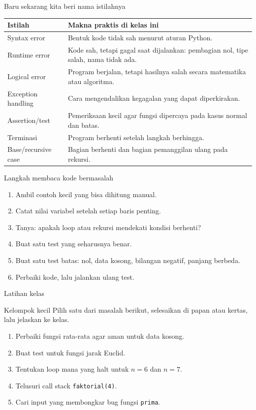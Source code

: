 \documentclass[aspectratio=169,11pt]{beamer}
\begin{document}
\begin{frame}{Baru sekarang kita beri nama istilahnya}
\begin{center}
\begin{tabular}{p{3.1cm}p{8.2cm}}
\toprule
Istilah & Makna praktis di kelas ini\\
\midrule
Syntax error & Bentuk kode tidak sah menurut aturan Python.\\
Runtime error & Kode sah, tetapi gagal saat dijalankan: pembagian nol, tipe salah, nama tidak ada.\\
Logical error & Program berjalan, tetapi hasilnya salah secara matematika atau algoritma.\\
Exception handling & Cara mengendalikan kegagalan yang dapat diperkirakan.\\
Assertion/test & Pemeriksaan kecil agar fungsi dipercaya pada kasus normal dan batas.\\
Terminasi & Program berhenti setelah langkah berhingga.\\
Base/recursive case & Bagian berhenti dan bagian pemanggilan ulang pada rekursi.\\
\bottomrule
\end{tabular}
\end{center}
\end{frame}

\begin{frame}{Langkah membaca kode bermasalah}
\begin{enumerate}
  \item Ambil contoh kecil yang bisa dihitung manual.
  \item Catat nilai variabel setelah setiap baris penting.
  \item Tanya: apakah loop atau rekursi mendekati kondisi berhenti?
  \item Buat satu test yang seharusnya benar.
  \item Buat satu test batas: nol, data kosong, bilangan negatif, panjang berbeda.
  \item Perbaiki kode, lalu jalankan ulang test.
\end{enumerate}
\end{frame}

\begin{frame}{Latihan kelas}
\begin{block}{Kelompok kecil}
Pilih satu dari masalah berikut, selesaikan di papan atau kertas, lalu jelaskan ke kelas.
\end{block}
\begin{enumerate}
  \item Perbaiki fungsi rata-rata agar aman untuk data kosong.
  \item Buat test untuk fungsi jarak Euclid.
  \item Tentukan loop mana yang halt untuk $n=6$ dan $n=7$.
  \item Telusuri call stack \texttt{faktorial(4)}.
  \item Cari input yang membongkar bug fungsi \texttt{prima}.
\end{enumerate}
\end{frame}
\end{document}
